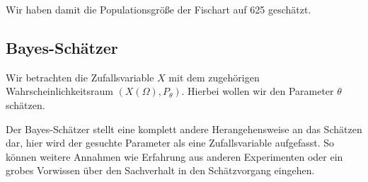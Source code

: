 Wir haben damit die Populationsgröße der Fischart auf 625 geschätzt.



\subsection{Bayes-Schätzer}
Wir betrachten die Zufallsvariable $X$ mit dem zugehörigen Wahrscheinlichkeitsraum $(X(\Omega), P_\theta)$. Hierbei wollen wir den Parameter $\theta$ schätzen. 

Der Bayes-Schätzer stellt eine komplett andere Herangehensweise an das Schätzen dar, hier wird der gesuchte Parameter als eine Zufallsvariable aufgefasst. So können weitere Annahmen wie Erfahrung aus anderen Experimenten oder ein grobes Vorwissen über den Sachverhalt in den Schätzvorgang eingehen.

